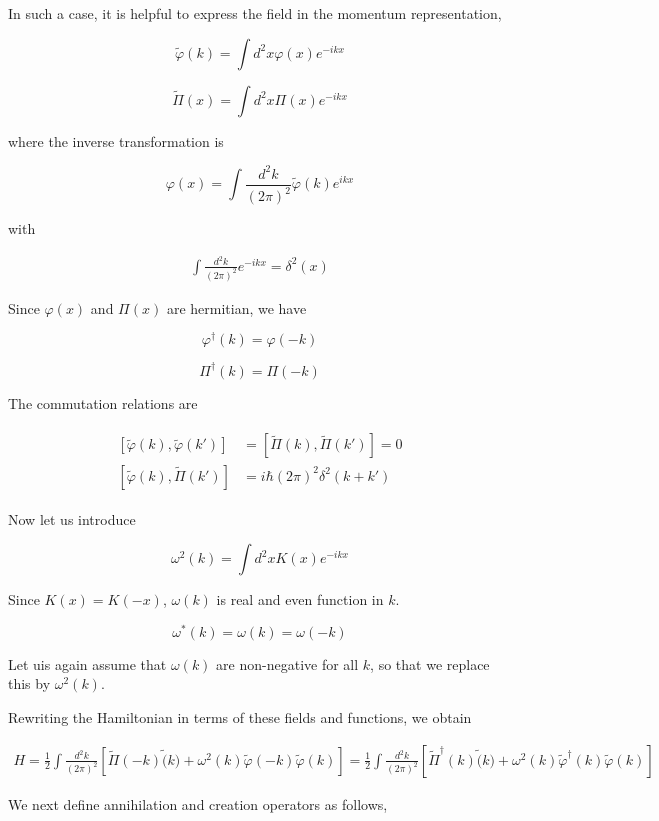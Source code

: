 In such a case, it is helpful to express the field in the momentum representation, 

\[\tilde{\varphi}(k) = \int d^2 x\varphi(x)e^{-ikx} \]

\[\tilde{\Pi}(x) = \int d^2 x \Pi(x) e^{-ikx} \]

where the inverse transformation is 

\[\varphi(x) = \int\frac{d^2 k}{(2\pi)^2} \tilde{\varphi}(k)e^{ikx} \]

with

\begin{align}
\int \frac{d^2 k}{(2\pi)^2}e^{-ikx} = \delta^2(x)
\end{align}

Since $\varphi(x)$ and $\Pi(x)$ are hermitian, we have

\[\varphi^\dagger(k) = \varphi(-k) \]

\[\Pi^\dagger(k) = \Pi(-k) \]

The commutation relations are

\begin{align}
\begin{split}
[\tilde{\varphi}(k), \tilde{\varphi}(k')] &= [\tilde{\Pi}(k), \tilde{\Pi}(k')] = 0\\
[\tilde{\varphi}(k),\tilde{\Pi}(k')] &= i\hbar(2\pi)^2\delta^2(k+k')
\end{split}
\end{align}

Now let us introduce 

\[\omega^2(k) = \int d^2x K(x)e^{-ikx} \]

Since $K(x) = K(-x)$, $\omega(k)$ is real and even function in $k$. 

\[\omega^*(k) = \omega(k) = \omega(-k) \]

Let uis again assume that $\omega(k)$ are non-negative for all $k$, so that we replace this by $\omega^2(k)$. 

Rewriting the Hamiltonian in terms of these fields and functions, we obtain

\begin{align}
H = \frac{1}{2}\int\frac{d^2 k}{(2\pi)^2}\left[\tilde{\Pi}(-k)\tilde(k)+\omega^2(k)\tilde{\varphi}(-k)\tilde{\varphi}(k)\right] = \frac{1}{2}\int\frac{d^2 k}{(2\pi)^2}\left[\tilde{\Pi}^\dagger (k)\tilde(k)+\omega^2(k)\tilde{\varphi}^\dagger(k)\tilde{\varphi}(k)\right]
\end{align}

We next define annihilation and creation operators as follows, 

